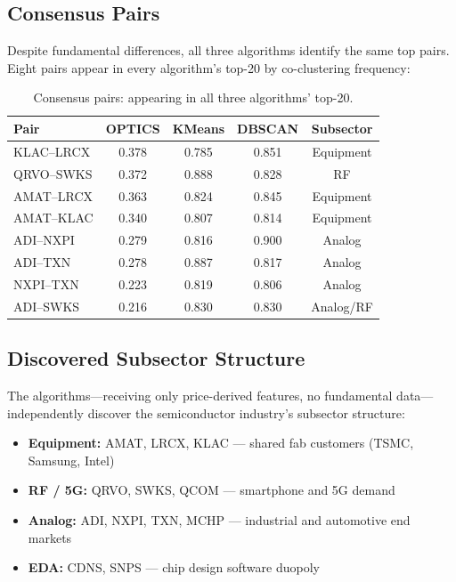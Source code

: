 \documentclass[11pt, a4paper]{article}
\begin{document}
\subsection{Consensus Pairs}

Despite fundamental differences, all three algorithms identify the same top pairs. Eight pairs appear in every algorithm's top-20 by co-clustering frequency:

\begin{table}[H]
\centering
\caption{Consensus pairs: appearing in all three algorithms' top-20.}
\begin{tabular}{@{}lcccc@{}}
\toprule
\textbf{Pair} & \textbf{OPTICS} & \textbf{KMeans} & \textbf{DBSCAN} & \textbf{Subsector} \\
\midrule
KLAC--LRCX  & 0.378 & 0.785 & 0.851 & Equipment \\
QRVO--SWKS  & 0.372 & 0.888 & 0.828 & RF \\
AMAT--LRCX  & 0.363 & 0.824 & 0.845 & Equipment \\
AMAT--KLAC  & 0.340 & 0.807 & 0.814 & Equipment \\
ADI--NXPI   & 0.279 & 0.816 & 0.900 & Analog \\
ADI--TXN    & 0.278 & 0.887 & 0.817 & Analog \\
NXPI--TXN   & 0.223 & 0.819 & 0.806 & Analog \\
ADI--SWKS   & 0.216 & 0.830 & 0.830 & Analog/RF \\
\bottomrule
\end{tabular}
\label{tab:consensus}
\end{table}

\subsection{Discovered Subsector Structure}

The algorithms---receiving only price-derived features, no fundamental data---independently discover the semiconductor industry's subsector structure:

\begin{itemize}
    \item \textbf{Equipment:} AMAT, LRCX, KLAC --- shared fab customers (TSMC, Samsung, Intel)
    \item \textbf{RF / 5G:} QRVO, SWKS, QCOM --- smartphone and 5G demand
    \item \textbf{Analog:} ADI, NXPI, TXN, MCHP --- industrial and automotive end markets
    \item \textbf{EDA:} CDNS, SNPS --- chip design software duopoly
\end{itemize}
\end{document}
